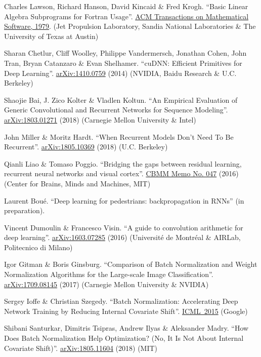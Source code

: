 \documentclass{article}
\begin{document}
\begin{thebibliography}{10}
 Charles Lawson, Richard Hanson, David Kincaid \& Fred Krogh. ``Basic Linear Algebra Subprograms for Fortran Usage''. \href{https://dl.acm.org/citation.cfm?id=355847}{ACM Transactions on Mathematical Software, 1979}. (Jet Propulsion Laboratory, Sandia National Laboratories \& The University of Texas at Austin)

 Sharan Chetlur, Cliff Woolley, Philippe Vandermersch, Jonathan Cohen, John Tran, Bryan Catanzaro \& Evan Shelhamer. ``cuDNN: Efficient Primitives for Deep Learning''. \href{https://arxiv.org/abs/1410.0759}{arXiv:1410.0759} (2014) (NVIDIA, Baidu Research \& U.C. Berkeley)

 Shaojie Bai, J. Zico Kolter \& Vladlen Koltun. ``An Empirical Evaluation of Generic Convolutional and Recurrent Networks for Sequence Modeling''. \href{https://arxiv.org/abs/1803.01271}{arXiv:1803.01271} (2018) (Carnegie Mellon University \& Intel)

 John Miller \& Moritz Hardt. ``When Recurrent Models Don't Need To Be Recurrent''. \href{https://arxiv.org/abs/1805.10369}{arXiv:1805.10369} (2018) (U.C. Berkeley)

 Qianli Liao \& Tomaso Poggio. ``Bridging the gaps between residual learning, recurrent neural networks and visual cortex''. \href{https://arxiv.org/pdf/1604.03640.pdf}{CBMM Memo No. 047} (2016) (Center for Brains, Minds and Machines, MIT)

 Laurent Bou\'e. ``Deep learning for pedestrians: backpropagation in RNNs'' (in preparation).

 Vincent Dumoulin \& Francesco Visin. ``A guide to convolution arithmetic for deep learning''. \href{https://arxiv.org/pdf/1603.07285.pdf}{arXiv:1603.07285} (2016) (Universit\'e de Montr\'eal \& AIRLab, Politecnico di Milano)

 Igor Gitman \& Boris Ginsburg. ``Comparison of Batch Normalization and Weight Normalization Algorithms for the Large-scale Image Classification''. \href{https://arxiv.org/pdf/1709.08145.pdf}{	arXiv:1709.08145} (2017) (Carnegie Mellon University \& NVIDIA)

 Sergey Ioffe \& Christian Szegedy. ``Batch Normalization: Accelerating Deep Network Training by Reducing Internal Covariate Shift''. \href{http://proceedings.mlr.press/v37/ioffe15.pdf}{ICML~2015} (Google)

 Shibani Santurkar, Dimitris Tsipras, Andrew Ilyas \& Aleksander Madry. ``How Does Batch Normalization Help Optimization? (No, It Is Not About Internal Covariate Shift)''. \href{https://arxiv.org/pdf/1805.11604.pdf}{arXiv:1805.11604} (2018) (MIT)


\end{thebibliography}
\end{document}
